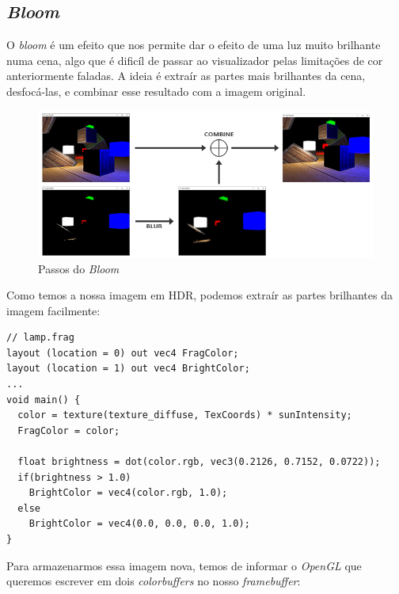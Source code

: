 \subsection{\textit{Bloom}}
\label{chap2:sec:bloom}

\noindent
O \textit{bloom} é um efeito que nos permite dar o efeito de uma luz muito brilhante numa cena, algo que é dificíl de passar ao visualizador pelas limitações de cor anteriormente faladas.
A ideia é extraír as partes mais brilhantes da cena, desfocá-las, e combinar esse resultado com a imagem original.

\begin{figure}[h]
\centering
\includegraphics[width=450pt]{bloom_steps.png}
\caption{Passos do \textit{Bloom}}
\end{figure}

\newpage

\noindent
Como temos a nossa imagem em \ac{HDR}, podemos extraír as partes brilhantes da imagem facilmente:

\begin{lstlisting}[style=Cpp, caption=\textit{Fragment shader} do \textit{bloom}]
// lamp.frag
layout (location = 0) out vec4 FragColor;
layout (location = 1) out vec4 BrightColor;
...
void main() {
  color = texture(texture_diffuse, TexCoords) * sunIntensity;
  FragColor = color;

  float brightness = dot(color.rgb, vec3(0.2126, 0.7152, 0.0722));
  if(brightness > 1.0)
    BrightColor = vec4(color.rgb, 1.0);
  else
    BrightColor = vec4(0.0, 0.0, 0.0, 1.0);
}
\end{lstlisting}

\noindent
Para armazenarmos essa imagem nova, temos de informar o \textit{OpenGL} que queremos escrever em dois \textit{colorbuffers} no nosso \textit{framebuffer}:

